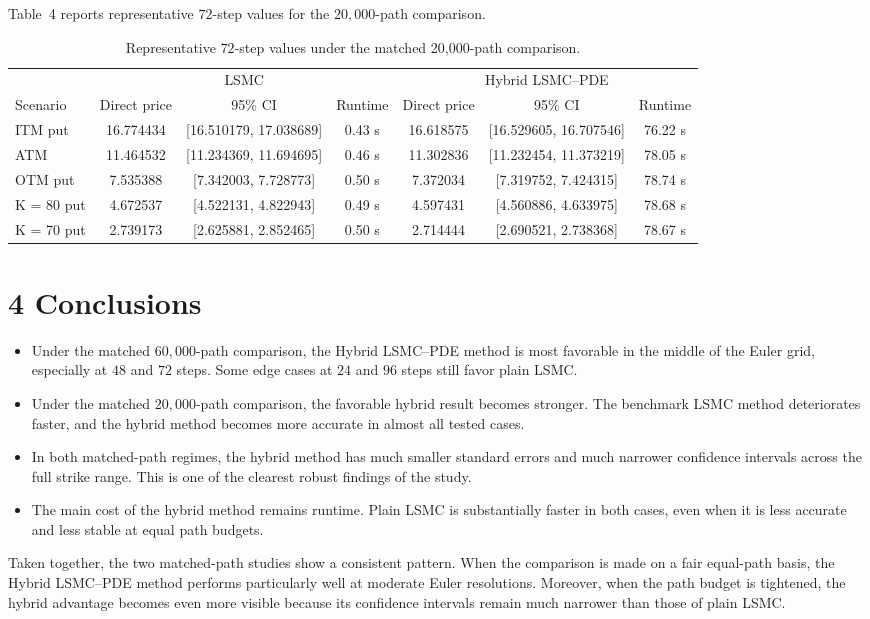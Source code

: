 \documentclass[11pt,a4paper]{article}
\begin{document}
Table~4 reports representative \(72\)-step values for the \(20{,}000\)-path comparison.

\begin{table}[p]
\centering
\caption{Representative \(72\)-step values under the matched 20,000-path comparison.}
\begin{tabular}{lcccccc}
\toprule
& \multicolumn{3}{c}{LSMC} & \multicolumn{3}{c}{Hybrid LSMC--PDE} \\
\cmidrule(lr){2-4}\cmidrule(lr){5-7}
Scenario & Direct price & 95\% CI & Runtime & Direct price & 95\% CI & Runtime \\
\midrule
ITM put & 16.774434 & [16.510179, 17.038689] & 0.43 s & 16.618575 & [16.529605, 16.707546] & 76.22 s \\
ATM & 11.464532 & [11.234369, 11.694695] & 0.46 s & 11.302836 & [11.232454, 11.373219] & 78.05 s \\
OTM put & 7.535388 & [7.342003, 7.728773] & 0.50 s & 7.372034 & [7.319752, 7.424315] & 78.74 s \\
K = 80 put & 4.672537 & [4.522131, 4.822943] & 0.49 s & 4.597431 & [4.560886, 4.633975] & 78.68 s \\
K = 70 put & 2.739173 & [2.625881, 2.852465] & 0.50 s & 2.714444 & [2.690521, 2.738368] & 78.67 s \\
\bottomrule
\end{tabular}
\end{table}

\section*{4 \quad Conclusions}

\begin{itemize}
\item Under the matched \(60{,}000\)-path comparison, the Hybrid LSMC--PDE method is most favorable in the middle of the Euler grid, especially at \(48\) and \(72\) steps. Some edge cases at \(24\) and \(96\) steps still favor plain LSMC.
\item Under the matched \(20{,}000\)-path comparison, the favorable hybrid result becomes stronger. The benchmark LSMC method deteriorates faster, and the hybrid method becomes more accurate in almost all tested cases.
\item In both matched-path regimes, the hybrid method has much smaller standard errors and much narrower confidence intervals across the full strike range. This is one of the clearest robust findings of the study.
\item The main cost of the hybrid method remains runtime. Plain LSMC is substantially faster in both cases, even when it is less accurate and less stable at equal path budgets.
\end{itemize}

Taken together, the two matched-path studies show a consistent pattern. When the comparison is made on a fair equal-path basis, the Hybrid LSMC--PDE method performs particularly well at moderate Euler resolutions. Moreover, when the path budget is tightened, the hybrid advantage becomes even more visible because its confidence intervals remain much narrower than those of plain LSMC.
\end{document}
